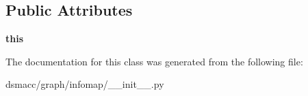 \subsection*{Public Attributes}
\begin{DoxyCompactItemize}
\item 
\mbox{\label{classdsmacc_1_1graph_1_1infomap_1_1MultiplexNetwork_abf686f74a09985f54b79923db242ad38}} 
{\bfseries this}
\end{DoxyCompactItemize}


The documentation for this class was generated from the following file\+:\begin{DoxyCompactItemize}
\item 
dsmacc/graph/infomap/\+\_\+\+\_\+init\+\_\+\+\_\+.\+py\end{DoxyCompactItemize}
